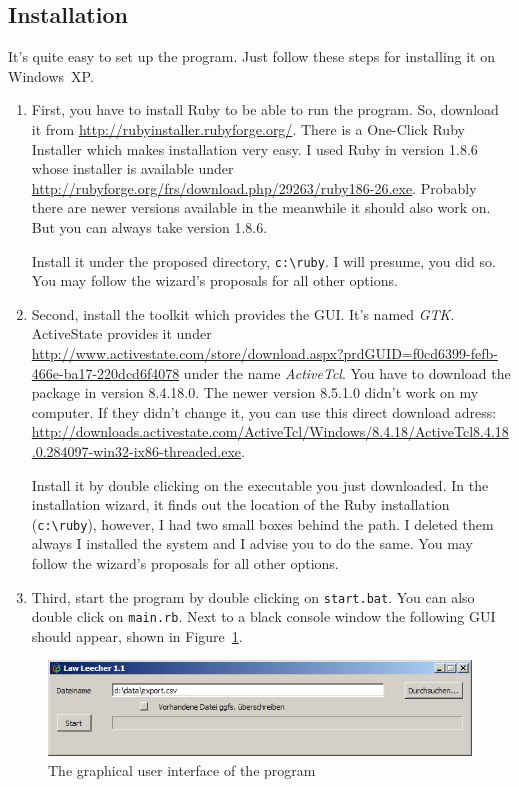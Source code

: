 \documentclass{scrartcl}
\begin{document}
\subsection{Installation}
It's quite easy to set up the program. Just follow these steps for installing it on Windows~XP.
\begin{enumerate}
  \item First, you have to install Ruby to be able to run the program. So, download it from \url{http://rubyinstaller.rubyforge.org/}. There is a One-Click Ruby Installer which makes installation very easy. I used Ruby in version 1.8.6 whose installer is available under \url{http://rubyforge.org/frs/download.php/29263/ruby186-26.exe}. Probably there are newer versions available in the meanwhile it should also work on. But you can always take version 1.8.6.
  
  Install it under the proposed directory, \texttt{c:\textbackslash ruby}. I will presume, you did so. You may follow the wizard's proposals for all other options.

  \item Second, install the toolkit which provides the GUI. It's named \textit{GTK}. ActiveState provides it under \url{http://www.activestate.com/store/download.aspx?prdGUID=f0cd6399-fefb-466e-ba17-220dcd6f4078} under the name \textit{ActiveTcl}. You have to download the package in version 8.4.18.0. The newer version 8.5.1.0 didn't work on my computer. If they didn't change it, you can use this direct download adress: \url{http://downloads.activestate.com/ActiveTcl/Windows/8.4.18/ActiveTcl8.4.18.0.284097-win32-ix86-threaded.exe}.
  
  Install it by double clicking on the executable you just downloaded. In the installation wizard, it finds out the location of the Ruby installation (\texttt{c:\textbackslash ruby}), however, I had two small boxes behind the path. I deleted them always I installed the system and I advise you to do the same. You may follow the wizard's proposals for all other options.


  \item Third, start the program by double clicking on \texttt{start.bat}. You can also double click on \texttt{main.rb}. Next to a black console window the following GUI should appear, shown in Figure~\ref{GUI}.
\end{enumerate}

  \begin{figure}[ht]
  \begin{center}
  \includegraphics[width = \textwidth]{GUI.png}
  \caption{The graphical user interface of the program}
  \label{GUI}
  \end{center}
  \end{figure}
\end{document}
